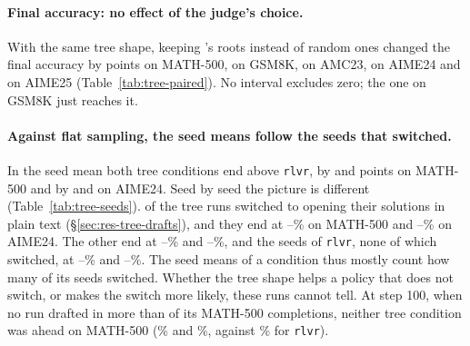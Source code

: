 \paragraph{Final accuracy: no effect of the judge's choice.} With the same tree shape, keeping \kev{}'s roots instead
of random ones changed the final accuracy by 
 points on MATH-500, 
 on GSM8K, 
 on AMC23, 
 on AIME24 and 
 on AIME25 (Table~\ref{tab:tree-paired}). No
interval excludes zero; the one on GSM8K just reaches it.

\paragraph{Against flat sampling, the seed means follow the seeds that switched.} In the seed mean both tree conditions
end above \texttt{rlvr}, by  and  points on MATH-500 and by
 and  on AIME24. Seed by seed the picture is different
(Table~\ref{tab:tree-seeds}).  of the tree runs switched to opening their solutions in plain text
(\S\ref{sec:res-tree-drafts}), and they end at --\% on MATH-500 and
--\% on AIME24. The other  end at
--\% and --\%, and the
 seeds of \texttt{rlvr}, none of which switched, at --\% and
--\%. The seed means of a condition thus mostly count how many of its seeds
switched. Whether the tree shape helps a policy that does not switch, or makes the switch more likely, these runs
cannot tell. At step 100, when no run drafted in more than  of its MATH-500 completions, neither
tree condition was ahead on MATH-500 (\% and \%, against
\% for \texttt{rlvr}).

